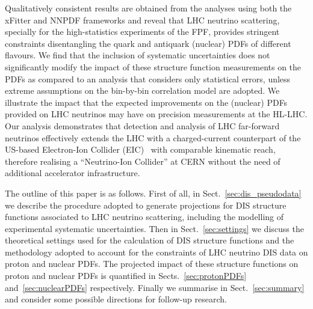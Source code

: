 Qualitatively consistent results are obtained from the analyses using both the {\sc\small xFitter}
and NNPDF frameworks and reveal that  LHC neutrino scattering, specially
for the high-statistics  experiments of the FPF, provides  stringent constraints
disentangling the quark and antiquark (nuclear) PDFs of different flavours.
%
We find that the inclusion of systematic uncertainties does not significantly modify the
impact of these structure function measurements on the PDFs as compared
to an analysis that considers only statistical errors, unless extreme assumptions on the bin-by-bin
correlation model are adopted.
%
We illustrate the impact that the expected improvements on the (nuclear) PDFs provided 
on LHC neutrinos may have on precision measurements at the HL-LHC.
%
Our analysis demonstrates that detection and analysis of LHC far-forward neutrinos  effectively
extends the LHC with a charged-current counterpart of the
US-based Electron-Ion Collider (EIC)~\cite{AbdulKhalek:2021gbh}
with comparable kinematic reach, therefore realising a ``Neutrino-Ion Collider'' at CERN
without the need of additional accelerator infrastructure.


The outline of this paper is as follows.
%
First of all, in Sect.~\ref{sec:dis_pseudodata} we describe the procedure
adopted to generate projections for DIS structure functions associated to
LHC neutrino scattering, including the modelling of experimental systematic
uncertainties.
%
Then in Sect.~\ref{sec:settings} we discuss the theoretical settings used
for the calculation of DIS structure functions and the methodology adopted
to account for the constraints of LHC neutrino DIS data on proton and nuclear PDFs.
%
The projected impact of these structure functions on proton and nuclear
PDFs is quantified in Sects.~\ref{sec:protonPDFs} and~\ref{sec:nuclearPDFs} respectively.
%
Finally we summarise in Sect.~\ref{sec:summary} and consider some possible
directions for follow-up research.
